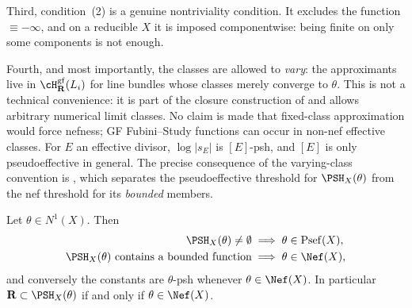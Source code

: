 Third, condition~(2) is a genuine nontriviality condition.  It excludes the
function \(\equiv-\infty\), and on a reducible \(X\) it is imposed
componentwise: being finite on only some components is not enough.

Fourth, and most importantly, the classes are allowed to \emph{vary}: the
approximants live in \(\cH^{\mathrm{gf}}_{\mathbf R}(L_i)\) for line bundles
whose classes merely converge to \(\theta\).  This is not a technical
convenience: it is part of the closure construction of
\cite[Definition~4.1]{BJ22} and allows arbitrary numerical limit classes.
No claim is made that fixed-class approximation would force nefness; GF
Fubini--Study functions can occur in non-nef effective classes.  For \(E\)
an effective divisor, \(\log|s_E|\) is \([E]\)-psh, and \([E]\) is only
pseudoeffective in general.  The precise
consequence of the varying-class convention is
, which separates the pseudoeffective threshold
for \(\PSH_X(\theta)\) from the nef threshold for its \emph{bounded}
members.

\begin{lemma}
\label{lem:ch34-psh-nonempty}
Let \(\theta\in N^1(X)\).  Then
\begin{equation}
\label{eq:psh-existence-cones}
 \begin{aligned}
 \PSH_X(\theta)\ne\emptyset
 &\implies \theta\in\operatorname{Psef}(X),\\
 \PSH_X(\theta)\ \text{contains a bounded function}
 &\implies \theta\in\Nef(X),
 \end{aligned}
\end{equation}
and conversely the constants are \(\theta\)-psh whenever
\(\theta\in\Nef(X)\).  In particular
\(\mathbf R\subset\PSH_X(\theta)\) if and only if \(\theta\in\Nef(X)\).
\end{lemma}

